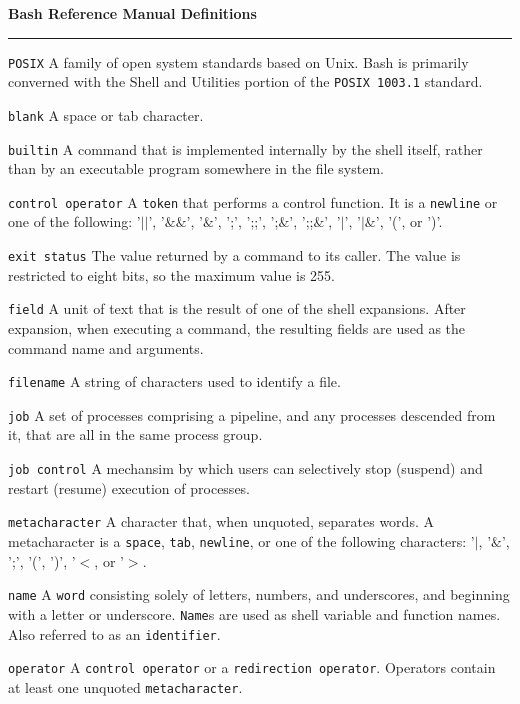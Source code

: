{\bf Bash Reference Manual Definitions}
\vskip 1mm
\hrule

\vskip 1cm
{\tt POSIX}
\vskip 1mm
A family of open system standards based on Unix. Bash is primarily converned with the Shell and Utilities portion of the {\tt POSIX 1003.1} standard.

\filbreak
\vskip 3mm
{\tt blank}
\vskip 1mm
A space or tab character.

\filbreak
\vskip 3mm
{\tt builtin}
\vskip 1mm
A command that is implemented internally by the shell itself, rather than by an executable program somewhere in the file system.

\filbreak
\vskip 3mm
{\tt control operator}
\vskip 1mm
A {\tt token} that performs a control function. It is a {\tt newline} or one of the following: '$||$', '$\&\&$', '$\&$', ';', ';;', ';$\&$', ';;$\&$', '$|$', '$|\&$', '(', or ')'.

\filbreak
\vskip 3mm
{\tt exit status}
\vskip 1mm
The value returned by a command to its caller. The value is restricted to eight bits, so the maximum value is 255.

\filbreak
\vskip 3mm
{\tt field}
\vskip 1mm
A unit of text that is the result of one of the shell expansions. After expansion, when executing a command, the resulting fields are used as the command name and arguments.

\filbreak
\vskip 3mm
{\tt filename}
\vskip 1mm
A string of characters used to identify a file.

\filbreak
\vskip 3mm
{\tt job}
\vskip 1mm
A set of processes comprising a pipeline, and any processes descended from it, that are all in the same process group.

\filbreak
\vskip 3mm
{\tt job control}
\vskip 1mm
A mechansim by which users can selectively stop (suspend) and restart (resume) execution of processes.

\filbreak
\vskip 3mm
{\tt metacharacter}
\vskip 1mm
A character that, when unquoted, separates words. A metacharacter is a {\tt space}, {\tt tab}, {\tt newline}, or one of the following characters: '$|$, '$\&$', ';', '(', ')', '$<$, or '$>$.

\filbreak
\vskip 3mm
{\tt name}
\vskip 1mm
A {\tt word} consisting solely of letters, numbers, and underscores, and beginning with a letter or underscore. {\tt Name}s are used as shell variable and function names. Also referred to as an {\tt identifier}.

\filbreak
\vskip 3mm
{\tt operator}
\vskip 1mm
A {\tt control operator} or a {\tt redirection operator}. Operators contain at least one unquoted {\tt metacharacter}.

